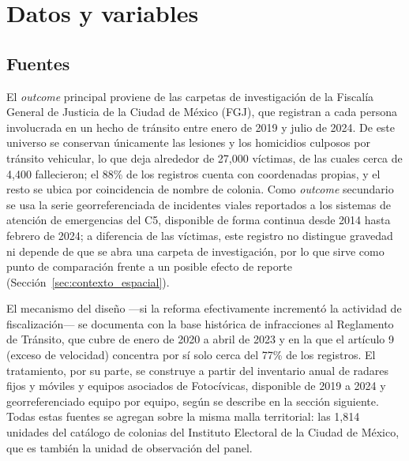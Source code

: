 \chapter{Datos y variables}
\label{chap:datos}


\section{Fuentes}

El \emph{outcome} principal proviene de las carpetas de investigación de la
Fiscalía General de Justicia de la Ciudad de México (FGJ), que registran a
cada persona involucrada en un hecho de tránsito entre enero de 2019 y julio
de 2024. De este universo se conservan únicamente las lesiones y los
homicidios culposos por tránsito vehicular, lo que deja alrededor de
27{,}000 víctimas, de las cuales cerca de 4{,}400 fallecieron; el 88\% de los
registros cuenta con coordenadas propias, y el resto se ubica por coincidencia
de nombre de colonia. Como \emph{outcome} secundario se usa la serie
georreferenciada de incidentes viales reportados a los sistemas de atención de
emergencias del C5, disponible de forma continua desde 2014 hasta febrero de
2024; a diferencia de las víctimas, este registro no distingue gravedad ni
depende de que se abra una carpeta de investigación, por lo que sirve como
punto de comparación frente a un posible efecto de reporte
(Sección~\ref{sec:contexto_espacial}).

El mecanismo del diseño —si la reforma efectivamente incrementó la actividad
de fiscalización— se documenta con la base histórica de infracciones al
Reglamento de Tránsito, que cubre de enero de 2020 a abril de 2023 y en la que
el artículo 9 (exceso de velocidad) concentra por sí solo cerca del 77\% de
los registros. El tratamiento, por su parte, se construye a partir del
inventario anual de radares fijos y móviles y equipos asociados de
Fotocívicas, disponible de 2019 a 2024 y georreferenciado equipo por equipo,
según se describe en la sección siguiente. Todas estas fuentes se agregan
sobre la misma malla territorial: las 1{,}814 unidades del catálogo de
colonias del Instituto Electoral de la Ciudad de México, que es también la
unidad de observación del panel.

